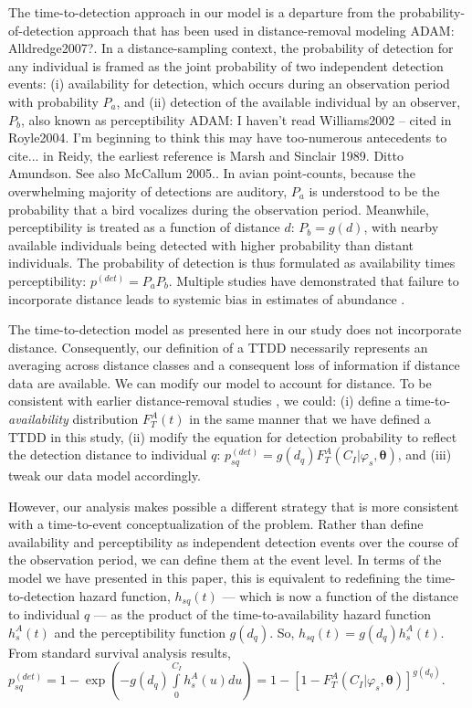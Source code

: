 \documentclass[useAMS,usenatbib,referee,12pt]{article}
\newcommand{\adam}[1]{{\color{blue} ADAM: #1}}
\begin{document}
The time-to-detection approach in our model is a departure from the probability-of-detection approach that has been used in distance-removal modeling \citep{Farnsworth2005, Diefenbach2007, Solymos2013, Amundson2014}\adam{Alldredge2007?}.  
In a distance-sampling context, the probability of detection for any individual is framed as the joint probability of two independent detection events: (i) availability for detection, which occurs during an observation period with probability $P_a$, and (ii) detection of the available individual by an observer, $P_b$, also known as perceptibility \citep{Williams2002, Kery2008, Nichols2009}\adam{I haven't read Williams2002 -- cited in Royle2004.  
I'm  beginning to think this may have too-numerous antecedents to cite... in Reidy, the earliest reference is Marsh and Sinclair 1989.  
Ditto Amundson.
See also McCallum 2005.}.  
In avian point-counts, because the overwhelming majority of detections are auditory, $P_a$ is understood to be the probability that a bird vocalizes during the observation period.  
Meanwhile, perceptibility is treated as a function of distance $d$: $P_b = g(d)$, with nearby available individuals being detected with higher probability than distant individuals.  
The probability of detection is thus formulated as availability times perceptibility: $p^{(det)} = P_aP_b$.  
Multiple studies have demonstrated that failure to incorporate distance leads to systemic bias in estimates of abundance \citep{EffordDawson2009, Solymos2013}.

The time-to-detection model as presented here in our study does not incorporate distance.  
Consequently, our definition of a TTDD necessarily represents an averaging across distance classes and a consequent loss of information if distance data are available.  
We can modify our model to account for distance.  
To be consistent with earlier distance-removal studies \citep{Farnsworth2005, Amundson2014}, we could: (i) define a time-to-\textit{availability} distribution $F_T^A(t)$ in the same manner that we have defined a TTDD in this study, (ii) modify the equation for detection probability to reflect the detection distance to individual $q$: $p_{sq}^{(det)} = g(d_q) F_T^A(C_I|\varphi_s, \boldsymbol{\theta})$, and (iii) tweak our data model accordingly.

However, our analysis makes possible a different strategy that is more consistent with a time-to-event conceptualization of the problem.  
Rather than define availability and perceptibility as independent detection events over the course of the observation period, we can define them at the event level.  
In terms of the model we have presented in this paper, this is equivalent to redefining the time-to-detection hazard function, $h_{sq}(t)$ --- which is now a function of the distance to individual $q$ --- as the product of the time-to-availability hazard function $h_{s}^A(t)$ and the perceptibility function $g(d_q)$.  
So, $h_{sq}(t) = g(d_q) h_{s}^A(t)$.  
From standard survival analysis results, $p_{sq}^{(det)} = 1 - \exp\left(-g(d_q)\int\limits_0^{C_I} h_{s}^A(u)du\right) = 1 - \left[1 - F_T^A(C_I|\varphi_s, \boldsymbol{\theta}) \right]^{g(d_q)}$.
\end{document}
